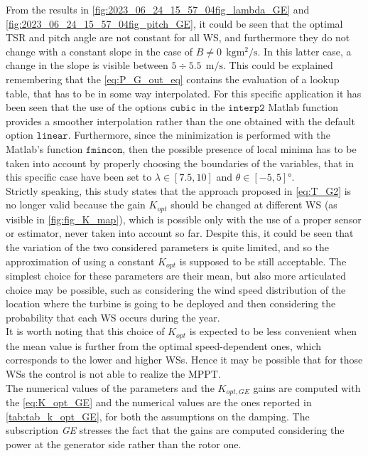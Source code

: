 From the results in \autoref{fig:2023_06_24_15_57_04fig_lambda_GE} and \ref{fig:2023_06_24_15_57_04fig_pitch_GE}, it could be seen that the optimal TSR and pitch angle are not constant for all WS, and furthermore they do not change with a constant slope in the case of $B\neq0 \ \ \si{\kilo\gram\square\meter\per\second}$. In this latter case, a change in the slope is visible between $5\div5.5 \ \ \si{\meter \per\second}$. This could be explained remembering that the \autoref{eq:P_G_out_eq} contains the evaluation of a lookup table, that has to be in some way interpolated. For this specific application it has been seen that the use of the options $\texttt{cubic}$ in the $\texttt{interp2}$ Matlab function provides a smoother interpolation rather than the one obtained with the default option $\texttt{linear}$. Furthermore, since the minimization is performed with the Matlab's function $\texttt{fmincon}$, then the possible presence of local minima has to be taken into account by properly choosing the boundaries of the variables, that in this specific case have been set to $\lambda \in \left[7.5, 10\right]$ and $\theta\in\left[-5, 5\right] \si{\degree}$.  \\
Strictly speaking, this study states that the approach proposed in \autoref{eq:T_G2} is no longer valid because the gain $K_{opt}$ should be changed at different WS (as visible in \autoref{fig:fig_K_map}), which is possible only with the use of a proper sensor or estimator, never taken into account so far. Despite this, it could be seen that the variation of the two considered parameters is quite limited, and so the approximation of using a constant $K_{opt}$ is supposed to be still acceptable. The simplest choice for these parameters are their mean, but also more articulated choice may be possible, such as considering the wind speed distribution of the location where the turbine is going to be deployed and then considering the probability that each WS occurs during the year.\\
It is worth noting that this choice of $K_{opt}$ is expected to be less convenient when the mean value is further from the optimal speed-dependent ones, which corresponds to the lower and higher WSs. Hence it may be possible that for those WSs the control is not able to realize the \acrfull{MPPT}.\\ 
The numerical values of the parameters and the $K_{opt,GE}$ gains are computed with the \autoref{eq:K_opt_GE} and the numerical values are the ones reported in \autoref{tab:tab_k_opt_GE}, for both the assumptions on the damping. The subscription \textit{GE} stresses the fact that the gains are computed considering the power at the generator side rather than the rotor one.

